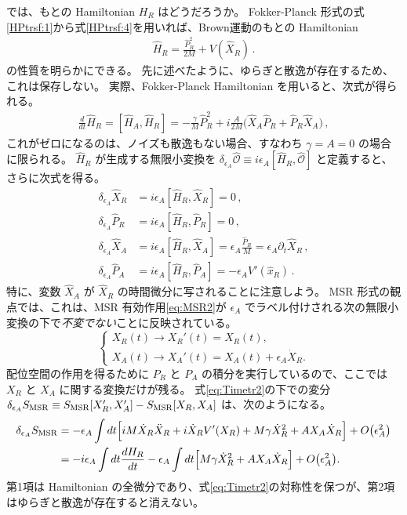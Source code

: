 \medskip
では、もとの Hamiltonian $H_R$ はどうだろうか。
Fokker-Planck 形式の式\eqref{HPtrsf:1}から式\eqref{HPtrsf:4}を用いれば、Brown運動のもとの Hamiltonian
\begin{align}
 \hat{H}_R=\frac{\hat{P}^2_R}{2M} + V(\hat{X}_R)\,.
\end{align}
の性質を明らかにできる。
先に述べたように、ゆらぎと散逸が存在するため、これは保存しない。
実際、Fokker-Planck Hamiltonian を用いると、次式が得られる。
\begin{align}
 \frac{d}{dt} \hat{H}_R =  [\hat{H}_A, \hat{H}_R] 
 = -\frac{\gamma}{M} \hat{P}^2_R 
 + i\frac{A}{2M} 
 \big(\hat{X}_A \hat{P}_R + \hat{P}_R \hat{X}_A \big) \,,
\end{align}
これがゼロになるのは、ノイズも散逸もない場合、すなわち $\gamma=A=0$ の場合に限られる。
$\hat H_R$ が生成する無限小変換を $\delta_{\epsilon_A} \hat{\mathcal{O}} \equiv i\epsilon_A [\hat{H}_R, \hat{\mathcal{O}}]$ と定義すると、さらに次式を得る。
\begin{align}
 \label{Hx}
 \delta_{\epsilon_A} \hat{X}_R &= i\epsilon_A[\hat{H}_R, \hat{X}_R] = 0\,,
 \\
 \delta_{\epsilon_A} \hat{P}_R &= i\epsilon_A [\hat{H}_R, \hat{P}_R] = 0\,,
 \\
 \label{Hx_A}
 \delta_{\epsilon_A} \hat{X}_A &= i\epsilon_A [\hat{H}_R, \hat{X}_A] 
 = \epsilon_A\frac{\hat{P}_R}{M} = \epsilon_A \partial_t \hat{X}_R\,,
 \\
 \delta_{\epsilon_A} \hat{P}_A &= i\epsilon_A [ \hat{H}_R, \hat{P}_A] 
 = -\epsilon_A V'(\hat{x}_R)\,.
\end{align}
特に、変数 $\hat{X}_A$ が $\hat{X}_R$ の時間微分に写されることに注意しよう。
MSR 形式の観点では、これは、MSR 有効作用\eqref{eq:MSR2}が $\epsilon_A$ でラベル付けされる次の無限小変換の下で\textit{不変でない}ことに反映されている。
\begin{equation}
 \begin{cases}
  X_R (t) \to X_R' (t) = X_R (t), \\ 
  X_A (t) \to X_A' (t) = X_A (t) + \epsilon_A \dot{X}_R .
 \end{cases}
 \label{eq:Timetr2}
\end{equation}
配位空間の作用を得るために $P_R$ と $P_A$ の積分を実行しているので、ここでは $X_R$ と $X_A$ に関する変換だけが残る。
式\eqref{eq:Timetr2}の下での変分 $\delta_{\epsilon_A} S_{{\mathrm{MSR}}} \equiv S_{{\mathrm{MSR}}} [X_R', X_A'] - S_{{\mathrm{MSR}}} [X_R, X_A]$ は、次のようになる。
\begin{equation}
 \begin{split}
  \delta_{\epsilon_A} S_{{\mathrm{MSR}}} 
  &= - \epsilon_A \int dt
  \Big[ i M \dot{X}_R \ddot{X}_R + i\dot{X}_R V'(X_R) 
  + M \gamma \dot{X}_R^2 + A X_A \dot{X}_R \Big]
  + O \big( \epsilon_A^2 \big) \\
  &= - i \epsilon_A \int dt
  \frac{d H_R}{dt} 
  -  \epsilon_A \int dt
  \Big[ M \gamma \dot{X}_R^2 + A X_A \dot{X}_R \Big]
  + O \big( \epsilon_A^2 \big) .
 \end{split}
\end{equation}
第1項は Hamiltonian の全微分であり、式\eqref{eq:Timetr2}の対称性を保つが、第2項はゆらぎと散逸が存在すると消えない。

